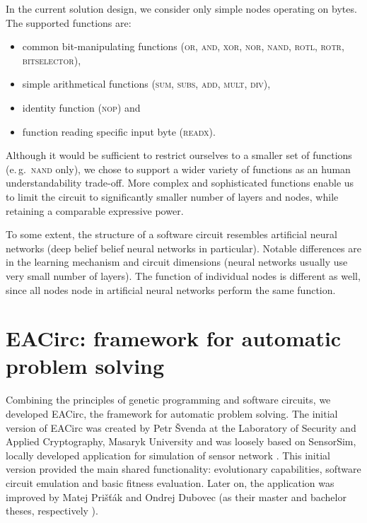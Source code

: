 \documentclass[12pt,oneside]{fithesis2}
\begin{document}
In the current solution design, we consider only simple nodes operating on bytes. The supported functions are:
\begin{itemize} \rightskip=2em
\item common bit-manipulating functions (\textsc{or, and, xor, nor, nand, rotl, rotr, bitselector}),
\item simple arithmetical functions (\textsc{sum, subs, add, mult, div}),
\item identity function (\textsc{nop}) and
\item function reading specific input byte (\textsc{readx}).
\end{itemize}

\noindent
Although it would be sufficient to restrict ourselves to a smaller set of functions (e.\,g.\ \textsc{nand} only),
we chose to support a wider variety of functions as an human understandability trade-off.
More complex and sophisticated functions enable us to limit the circuit to significantly smaller number of layers and nodes,
while retaining a comparable expressive power.

To some extent, the structure of a software circuit resembles artificial neural networks 
(deep belief belief neural networks in particular). Notable differences are in
the learning mechanism and circuit dimensions (neural networks usually use very small number of layers). 
The function of individual nodes is different as well, since all nodes node in artificial neural networks perform the same function.

\section{EACirc: framework for automatic problem solving}
\label{sec:eacirc-principles}

Combining the principles of genetic programming and software circuits, we developed EACirc, the framework for automatic
problem solving. The initial version of EACirc was created by Petr Švenda at 
the Laboratory of Security and Applied Cryptography, Masaryk University and was loosely based on SensorSim,
locally developed application for simulation of sensor network \parencite{sensor-sim}.
This initial version provided the main shared functionality: evolutionary capabilities, software circuit emulation
and basic fitness evaluation. Later on, the application was improved by Matej Prišťák and Ondrej Dubovec 
(as their master and bachelor theses, respectively \parencite{thesis-pristak, thesis-dubovec}).
\end{document}
